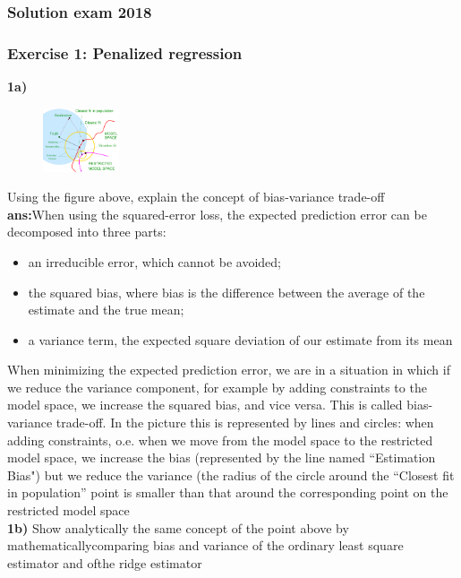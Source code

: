 \documentclass[a4paper, norsk, 8pt]{article}
\begin{document}
\tiny
\begin{multicols*}{2}
\subsubsection*{\scriptsize Solution exam 2018}
\subsubsection*{\scriptsize Exercise 1: Penalized regression}
\textbf{1a)}
\begin{figure}[H]
	\centering
	\includegraphics[width=0.2\textwidth]{bias_variance1.png}
\end{figure}   
Using the figure above, explain the concept of bias-variance trade-off\\
\textbf{ans:}When using the squared-error loss, the expected prediction error can be decomposed into three parts:
\begin{itemize}
	\setlength\itemsep{0.04em}
	\item an irreducible error, which cannot be avoided;
	\item the squared bias, where bias is the difference between the average of the estimate and the true mean;
	\item a variance term, the expected square deviation of our estimate from its mean
\end{itemize}
When minimizing the expected prediction error, we are in a situation in which if we reduce the variance component, for example by adding constraints to the model space, we increase the squared bias, and vice versa.  This is called bias-variance trade-off.  In the picture this is represented by lines and circles: when adding constraints, o.e. when we move from the model space to the restricted model space, we increase the bias (represented by the line named “Estimation Bias") but we reduce the variance (the radius of the circle around the “Closest fit in population” point is smaller than that around the corresponding point on the restricted model space\\
\textbf{1b)} Show analytically the same concept of the point above by mathematicallycomparing bias and variance of the ordinary least square estimator and ofthe ridge estimator\\

\end{multicols*}
\end{document}

